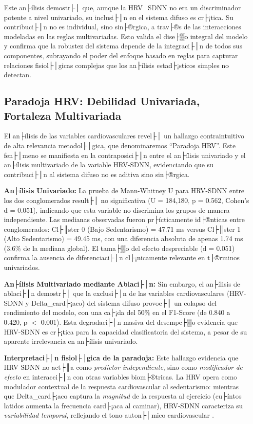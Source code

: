 Este an├ílisis demostr├│ que, aunque la HRV\_SDNN no era un discriminador potente a nivel univariado, su inclusi├│n en el sistema difuso es cr├¡tica. Su contribuci├│n no es individual, sino sin├®rgica, a trav├®s de las interacciones modeladas en las reglas multivariadas. Esto valida el dise├▒o integral del modelo y confirma que la robustez del sistema depende de la integraci├│n de todos sus componentes, subrayando el poder del enfoque basado en reglas para capturar relaciones fisiol├│gicas complejas que los an├ílisis estad├¡sticos simples no detectan.

\subsection{Paradoja HRV: Debilidad Univariada, Fortaleza Multivariada}
\label{subsec:paradoja_hrv}

El an├ílisis de las variables cardiovasculares revel├│ un hallazgo contraintuitivo de alta relevancia metodol├│gica, que denominaremos ``Paradoja HRV''. Este fen├│meno se manifiesta en la contraposici├│n entre el an├ílisis univariado y el an├ílisis multivariado de la variable HRV-SDNN, evidenciando que su contribuci├│n al sistema difuso no es aditiva sino sin├®rgica.

\textbf{An├ílisis Univariado:} La prueba de Mann-Whitney U para HRV-SDNN entre los dos conglomerados result├│ no significativa (U = 184,180, p = 0.562, Cohen's d = 0.051), indicando que esta variable no discrimina los grupos de manera independiente. Las medianas observadas fueron pr├ícticamente id├®nticas entre conglomerados: Cl├║ster 0 (Bajo Sedentarismo) = 47.71 ms versus Cl├║ster 1 (Alto Sedentarismo) = 49.45 ms, con una diferencia absoluta de apenas 1.74 ms (3.6\% de la mediana global). El tama├▒o del efecto despreciable (d = 0.051) confirma la ausencia de diferenciaci├│n cl├¡nicamente relevante en t├®rminos univariados.

\textbf{An├ílisis Multivariado mediante Ablaci├│n:} Sin embargo, el an├ílisis de ablaci├│n demostr├│ que la exclusi├│n de las variables cardiovasculares (HRV-SDNN y Delta\_card├¡aco) del sistema difuso provoc├│ un colapso del rendimiento del modelo, con una ca├¡da del 50\% en el F1-Score (de 0.840 a 0.420, p $<$ 0.001). Esta degradaci├│n masiva del desempe├▒o evidencia que HRV-SDNN es cr├¡tica para la capacidad clasificatoria del sistema, a pesar de su aparente irrelevancia en an├ílisis univariado.

\textbf{Interpretaci├│n fisiol├│gica de la paradoja:} Este hallazgo evidencia que HRV-SDNN no act├║a como \textit{predictor independiente}, sino como \textit{modificador de efecto} en interacci├│n con otras variables biom├®tricas. La HRV opera como modulador contextual de la respuesta cardiovascular al sedentarismo: mientras que Delta\_card├¡aco captura la \textit{magnitud} de la respuesta al ejercicio (cu├íntos latidos aumenta la frecuencia card├¡aca al caminar), HRV-SDNN caracteriza su \textit{variabilidad temporal}, reflejando el tono auton├│mico cardiovascular \cite{TaskForce1996,Laborde2017}.

